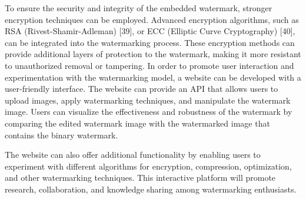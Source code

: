 \documentclass[conference]{IEEEtran}
\begin{document}
To ensure the security and integrity of the embedded watermark, stronger encryption techniques can be employed. Advanced encryption algorithms, such as RSA (Rivest-Shamir-Adleman) [39], or ECC (Elliptic Curve Cryptography) [40], can be integrated into the watermarking process. These encryption methods can provide additional layers of protection to the watermark, making it more resistant to unauthorized removal or tampering.
In order to promote user interaction and experimentation with the watermarking model, a website can be developed with a user-friendly interface. The website can provide an API that allows users to upload images, apply watermarking techniques, and manipulate the watermark image. Users can visualize the effectiveness and robustness of the watermark by comparing the edited watermark image with the watermarked image that contains the binary watermark. 

The website can also offer additional functionality by enabling users to experiment with different algorithms for encryption, compression, optimization, and other watermarking techniques. This interactive platform will promote research, collaboration, and knowledge sharing among watermarking enthusiasts.
\end{document}
